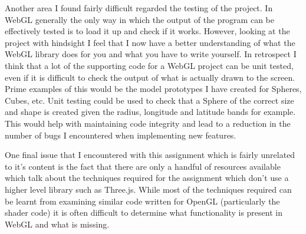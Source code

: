\documentclass[paper=a4, fontsize=11pt]{scrartcl}	%
\numberwithin{equation}{section}															%
\numberwithin{figure}{section}																%
\numberwithin{table}{section}																%
\begin{document}
Another area I found fairly difficult regarded the testing of the project. In WebGL generally the only way in which the output of the program can be effectively tested is to load it up and check if it works. However, looking at the project with hindsight I feel that I now have a better understanding of what the WebGL library does for you and what you have to write yourself. In retrospect I think that a lot of the supporting code for a WebGL project can be unit tested, even if it is difficult to check the output of what is actually drawn to the screen. Prime examples of this would be the model prototypes I have created for Spheres, Cubes, etc. Unit testing could be used to check that a Sphere of the correct size and shape is created given the radius, longitude and latitude bands for example. This would help with maintaining code integrity and lead to a reduction in the number of bugs I encountered when implementing new features.

One final issue that I encountered with this assignment which is fairly unrelated to it's content is the fact that there are only a handful of resources available which talk about the techniques required for the assignment which don't use a higher level library such as Three.js. While most of the techniques required can be learnt from examining similar code written for OpenGL (particularly the shader code) it is often difficult to determine what functionality is present in WebGL and what is missing.


\end{document}
